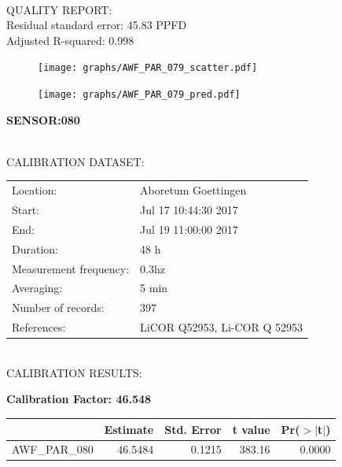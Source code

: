 \documentclass[oneside]{report}
\begin{document}
\hrulefill\\
QUALITY REPORT:\\
Residual standard error: 45.83 PPFD\\
Adjusted R-squared: 0.998



\begin{figure}[H]
  \centering
  \texttt{[image: graphs/AWF\_PAR\_079\_scatter.pdf]}
\end{figure}




\begin{figure}[H]
  \centering
  \texttt{[image: graphs/AWF\_PAR\_079\_pred.pdf]}
\end{figure}

\pagebreak


\begin{center}
\large{\textbf{SENSOR:080}}\\
\end{center}

\hrulefill\\
CALIBRATION DATASET:\\
\begin{table}[h!]
  \centering
  \label{tab:table1}
  \begin{tabular}{ll}
    Location: & Aboretum Goettingen\\ 
    
    
    Start:  & Jul 17 10:44:30 2017 \\
    End:   & Jul 19 11:00:00 2017\\ 
    Duration: & 48 h\\
    Measurement frequency: & 0.3hz\\
    Averaging:  &5 min\\
    Number of records: & 397 \\
    References: & LiCOR Q52953, Li-COR Q 52953 \\
  \end{tabular}
\end{table}

\hrulefill\\
CALIBRATION RESULTS:\\


\begin{center}
\textbf{\large{Calibration Factor: 46.548}}\\
\end{center}
\begin{table}[ht]
\centering
\begin{tabular}{rrrrr}
  \hline
 & Estimate & Std. Error & t value & Pr($>$$|$t$|$) \\ 
  \hline
AWF\_PAR\_080 & 46.5484 & 0.1215 & 383.16 & 0.0000 \\ 
   \hline
\end{tabular}
\end{table}
\end{document}
